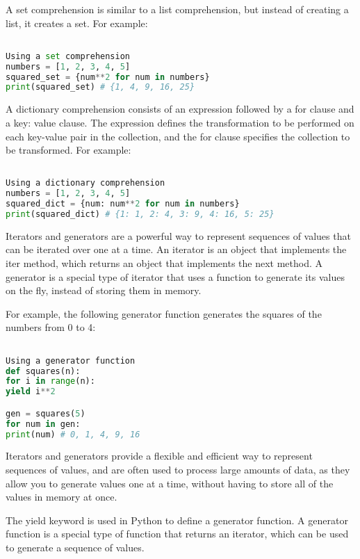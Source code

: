\documentclass[12pt, a4paper, oneside]{article}
\begin{document}
A set comprehension is similar to a list comprehension, but instead of creating a list, it creates a set. For example:

\begin{lstlisting}[language=Python, frame=single]

Using a set comprehension
numbers = [1, 2, 3, 4, 5]
squared_set = {num**2 for num in numbers}
print(squared_set) # {1, 4, 9, 16, 25}
\end{lstlisting}

A dictionary comprehension consists of an expression followed by a for clause and a key: value clause. The expression defines the transformation to be performed on each key-value pair in the collection, and the for clause specifies the collection to be transformed. For example:

\begin{lstlisting}[language=Python, frame=single]

Using a dictionary comprehension
numbers = [1, 2, 3, 4, 5]
squared_dict = {num: num**2 for num in numbers}
print(squared_dict) # {1: 1, 2: 4, 3: 9, 4: 16, 5: 25}
\end{lstlisting}

Iterators and generators are a powerful way to represent sequences of values that can be iterated over one at a time. An iterator is an object that implements the iter method, which returns an object that implements the next method. A generator is a special type of iterator that uses a function to generate its values on the fly, instead of storing them in memory.

For example, the following generator function generates the squares of the numbers from 0 to 4:

\begin{lstlisting}[language=Python, frame=single]

Using a generator function
def squares(n):
for i in range(n):
yield i**2

gen = squares(5)
for num in gen:
print(num) # 0, 1, 4, 9, 16
\end{lstlisting}

Iterators and generators provide a flexible and efficient way to represent sequences of values, and are often used to process large amounts of data, as they allow you to generate values one at a time, without having to store all of the values in memory at once.

The yield keyword is used in Python to define a generator function. A generator function is a special type of function that returns an iterator, which can be used to generate a sequence of values.
\end{document}
